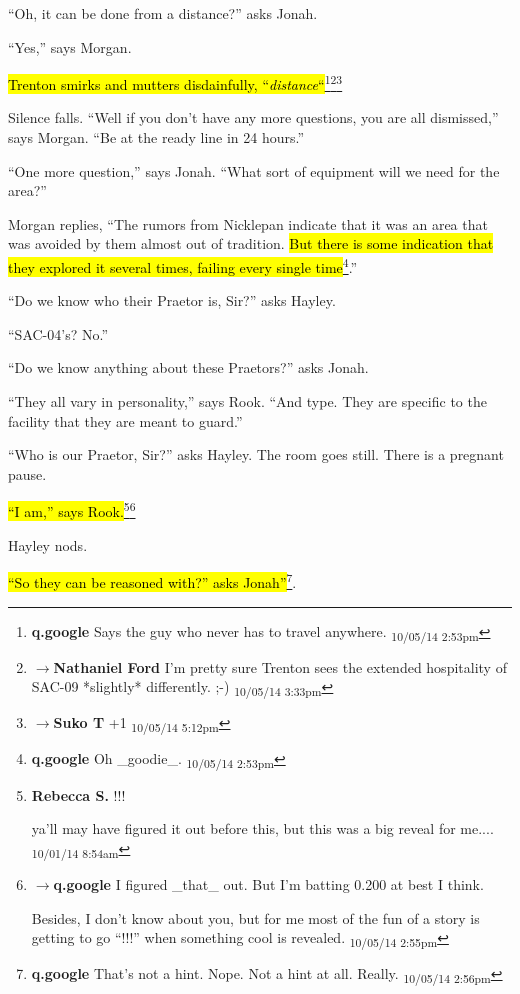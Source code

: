 ``Oh, it can be done from a distance?'' asks Jonah.

``Yes,'' says Morgan.  

\hl{Trenton smirks and mutters disdainfully, ``\textit{distance}``}\footnote{\textbf{q.google }Says the guy who never has to travel anywhere. \textsubscript{10/05/14 2:53pm}}\footnote{$\rightarrow$\textbf{Nathaniel Ford }I'm pretty sure Trenton sees the extended hospitality of SAC-09 *slightly* differently. ;-) \textsubscript{10/05/14 3:33pm}}\footnote{$\rightarrow$\textbf{Suko T }+1 \textsubscript{10/05/14 5:12pm}}

Silence falls.  ``Well if you don't have any more questions, you are all dismissed,'' says Morgan.  ``Be at the ready line in 24 hours.''

``One more question,'' says Jonah.  ``What sort of equipment will we need for the area?''

Morgan replies, ``The rumors from Nicklepan indicate that it was an area that was avoided by them almost out of tradition.  \hl{But there is some indication that they explored it several times, failing every single time}\footnote{\textbf{q.google }Oh \_goodie\_. \textsubscript{10/05/14 2:53pm}}.'' 

``Do we know who their Praetor is, Sir?'' asks Hayley.

``SAC-04's?  No.''

``Do we know anything about these Praetors?'' asks Jonah.

``They all vary in personality,'' says Rook. ``And type.  They are specific to the facility that they are meant to guard.''

``Who is our Praetor, Sir?'' asks Hayley.  The room goes still. There is a pregnant pause.

\hl{``I am,'' says Rook.}\footnote{\textbf{Rebecca S. }!!!

ya'll may have figured it out before this, but this was a big reveal for me.... \textsubscript{10/01/14 8:54am}}\footnote{$\rightarrow$\textbf{q.google }I figured \_that\_ out.  But I'm batting 0.200 at best I think.

Besides, I don't know about you, but for me most of the fun of a story is getting to go ``!!!'' when something cool is revealed. \textsubscript{10/05/14 2:55pm}}

Hayley nods.

\hl{``So they can be reasoned with?'' asks Jonah''}\footnote{\textbf{q.google }That's not a hint.  Nope.  Not a hint at all.  Really. \textsubscript{10/05/14 2:56pm}}.  

